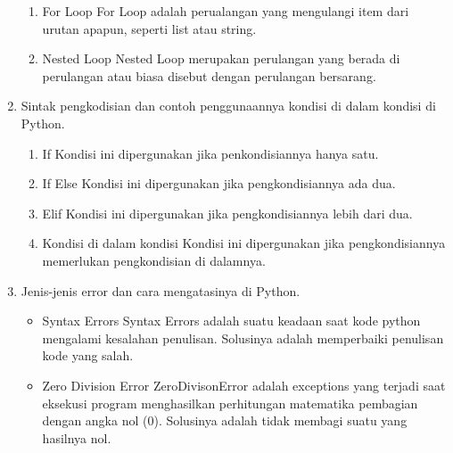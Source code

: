 \begin{enumerate}
\begin{enumerate}
\item For Loop
For Loop  adalah perualangan yang mengulangi item dari urutan apapun, seperti list atau string.


\item Nested Loop
Nested Loop merupakan perulangan yang berada di perulangan atau biasa disebut dengan perulangan bersarang.


\end{enumerate}

\item Sintak pengkodisian dan contoh penggunaannya kondisi di dalam kondisi di Python.
\begin{enumerate}
\item If
Kondisi ini dipergunakan jika penkondisiannya hanya satu.


\item If Else
Kondisi ini dipergunakan jika pengkondisiannya ada dua.


\item Elif
Kondisi ini dipergunakan jika pengkondisiannya lebih dari dua.


\item Kondisi di dalam kondisi
Kondisi ini dipergunakan jika pengkondisiannya memerlukan pengkondisian di dalamnya.


\end{enumerate}

\item Jenis-jenis error dan cara mengatasinya di Python.
\begin{itemize}
\item Syntax Errors
Syntax Errors adalah suatu keadaan saat kode python mengalami kesalahan penulisan. Solusinya adalah memperbaiki penulisan kode yang salah.

\item Zero Division Error
ZeroDivisonError adalah exceptions yang terjadi saat eksekusi program menghasilkan perhitungan matematika pembagian dengan angka nol (0). Solusinya adalah tidak membagi suatu yang hasilnya nol.


\end{itemize}
\end{enumerate}
